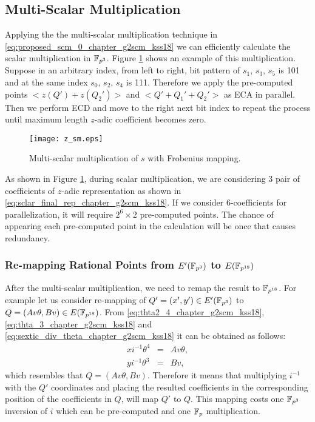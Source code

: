 \subsection{Multi-Scalar Multiplication}
Applying the the multi-scalar multiplication technique in \eqref{eq:proposed_scm_0_chapter_g2scm_kss18} we can efficiently calculate the scalar multiplication in $\mathbb{F}_{p^3}$. Figure \ref{eq:fig:z_sml_chapter_g2scm_kss18} shows an example of this multiplication.
Suppose in an arbitrary index, from left to right, bit pattern of $s_1$, $s_3$, $s_5$ is 101 and at the same index $s_0$, $s_2$, $s_4$ is 111.
Therefore we apply the pre-computed points $< z(Q')+z(Q_2') >$ and $<Q'+Q_1'+Q_2'>$ as ECA in parallel.
Then we perform ECD and move to the right next bit index to repeat the process until maximum length $z$-adic coefficient becomes zero.
\begin{figure}[!ht]
	\centering
	\texttt{[image: z\_sm.eps]}
	\caption{Multi-scalar multiplication of $s$ with Frobenius mapping.}
	\label{eq:fig:z_sml_chapter_g2scm_kss18}
\end{figure}

As shown in Figure \ref{eq:fig:z_sml_chapter_g2scm_kss18}, during scalar multiplication, we are considering 3 pair of coefficients of $z$-adic representation as shown in  \eqref{eq:sclar_final_rep_chapter_g2scm_kss18}. If we consider 6-coefficients for parallelization, it will require $2^6 \times 2$ pre-computed points. The chance of appearing each pre-computed point in the calculation will be once that causes redundancy.  

\subsubsection{Re-mapping Rational Points from \texorpdfstring{$E'(\mathbb{F}_{p^3})$}{} to  \texorpdfstring{$E(\mathbb{F}_{p^{18}})$}{}}
After the multi-scalar multiplication, we need to remap the result to $\mathbb{F}_{p^{18}}$. For example let us consider re-mapping of $Q' =(x',y') \in E'(\mathbb{F}_{p^3})$ to $Q =(Av\theta,Bv) \in E(\mathbb{F}_{p^{18}})$. From \eqref{eq:thta2_4_chapter_g2scm_kss18}, \eqref{eq:thta_3_chapter_g2scm_kss18} and \eqref{eq:sextic_div_theta_chapter_g2scm_kss18} it can be obtained as follows:
\begin{subequations}
	\begin{eqnarray}
	x i^{-1}\theta^{4} & = & Av\theta, \nonumber \\
	y i^{-1}\theta^{3} & = & Bv, \nonumber
	\end{eqnarray}
\end{subequations}
which resembles that $Q= (Av\theta, Bv)$. Therefore it means that multiplying $i^{-1}$ with the $Q'$ coordinates and placing the resulted coefficients in the corresponding position of the coefficients in $Q$, will map $Q'$ to $Q$.
This mapping costs one $\mathbb{F}_{p^3}$ inversion of $i$ which can be pre-computed and one ${\mathbb{F}}_{p}$ multiplication.

